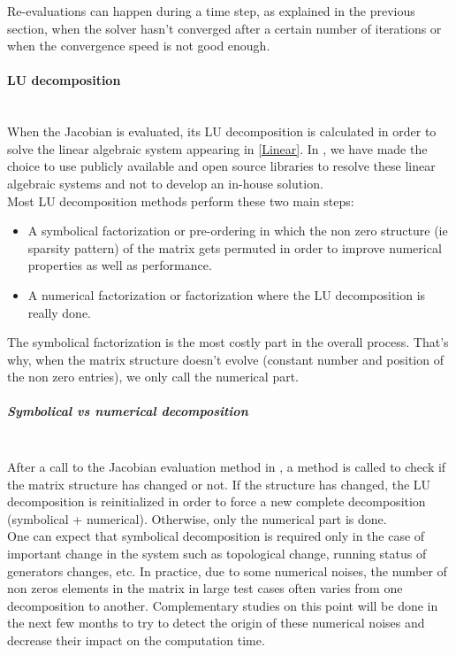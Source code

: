 \documentclass[a4paper, 12pt]{report}
\begin{document}
Re-evaluations can happen during a time step, as explained in the previous section, when the solver hasn't converged after a certain number of iterations or when the convergence speed is not good enough.

\paragraph{LU decomposition}
~~\\

When the Jacobian is evaluated, its LU decomposition is calculated in order to solve the linear algebraic system appearing in \eqref{Linear}. In \Dynawo , we have made the choice to use publicly available and open source libraries to resolve these linear algebraic systems and not to develop an in-house solution. \\

Most LU decomposition methods perform these two main steps:
\begin{itemize}
\item A symbolical factorization or pre-ordering in which the non zero structure (ie sparsity pattern) of the matrix gets permuted in order to improve numerical properties as well as performance.
\item A numerical factorization or factorization where the LU decomposition is really done.
\end{itemize}

The symbolical factorization is the most costly part in the overall process. That's why, when the matrix structure doesn't evolve (constant number and position of the non zero entries), we only call the numerical part.

\subparagraph{Symbolical vs numerical decomposition}
~~\\

After a call to the Jacobian evaluation method in \Dynawo, a method is called to check if the matrix structure has changed or not. If the structure has changed, the LU decomposition is reinitialized in order to force a new complete decomposition (symbolical + numerical). Otherwise, only the numerical part is done.  \\

One can expect that symbolical decomposition is required only in the case of important change in the system such as topological change, running status of generators changes, etc. In practice, due to some numerical noises, the number of non zeros elements in the matrix in large test cases often varies from one decomposition to another. Complementary studies on this point will be done in the next few months to try to detect the origin of these numerical noises and decrease their impact on the computation time.
\end{document}
